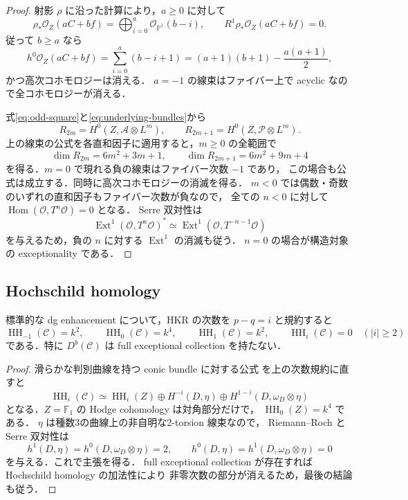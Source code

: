 \begin{proof}
射影 $\rho$ に沿った計算により，$a\ge0$ に対して
\[
 \rho_*\mathcal O_Z(aC+bf)
       =\bigoplus_{i=0}^a\mathcal O_{\mathbb P^1}(b-i),
 \qquad R^1\rho_*\mathcal O_Z(aC+bf)=0.
\]
従って $b\ge a$ なら
\[
 h^0\mathcal O_Z(aC+bf)
   =\sum_{i=0}^a(b-i+1)
   =(a+1)(b+1)-\frac{a(a+1)}2,
\]
かつ高次コホモロジーは消える．
$a=-1$ の線束はファイバー上で acyclic なので全コホモロジーが消える．

式\eqref{eq:odd-square}と\eqref{eq:underlying-bundles}から
\[
 R_{2m}=H^0(Z,\mathcal A\otimes L^m),\qquad
 R_{2m+1}=H^0(Z,\mathcal P\otimes L^m).
\]
上の線束の公式を各直和因子に適用すると，$m\ge0$ の全範囲で
\begin{equation}
 \dim R_{2m}=6m^2+3m+1,\qquad
 \dim R_{2m+1}=6m^2+9m+4
 \label{eq:Hilbert-parities}
\end{equation}
を得る．$m=0$ で現れる負の線束はファイバー次数 $-1$ であり，
この場合も公式は成立する．同時に高次コホモロジーの消滅を得る．
$m<0$ では偶数・奇数のいずれの直和因子もファイバー次数が負なので，
全ての $n<0$ に対して $\operatorname{Hom}(\mathcal O,T^n\mathcal O)=0$ となる．
Serre 双対性は
\[
 \operatorname{Ext}^1(\mathcal O,T^n\mathcal O)^*
 \simeq\operatorname{Ext}^1(\mathcal O,T^{-n-1}\mathcal O)
\]
を与えるため，負の $n$ に対する $\operatorname{Ext}^1$ の消滅も従う．
$n=0$ の場合が構造対象の exceptionality である．
\end{proof}

\subsection{Hochschild homology}

\begin{proposition}
\label{prop:HH-degree-three}
標準的な dg enhancement について，HKR の次数を $p-q=i$ と規約すると
\[
 \operatorname{HH}_{-1}(\mathcal C)=k^2,\qquad
 \operatorname{HH}_0(\mathcal C)=k^4,\qquad
 \operatorname{HH}_1(\mathcal C)=k^2,
 \qquad \operatorname{HH}_i(\mathcal C)=0\quad(|i|\ge2)
\]
である．特に $D^b(\mathcal C)$ は full exceptional collection を持たない．
\end{proposition}

\begin{proof}
滑らかな判別曲線を持つ conic bundle に対する公式
\cite[Theorem~8.12]{KuznetsovHH}を上の次数規約に直すと
\[
 \operatorname{HH}_i(\mathcal C)
 \simeq\operatorname{HH}_i(Z)
 \oplus H^{-i}(D,\eta)
 \oplus H^{1-i}(D,\omega_D\otimes\eta)
\]
となる．$Z=\mathbb F_1$ の Hodge cohomology は対角部分だけで，
$\operatorname{HH}_0(Z)=k^4$ である．
$\eta$ は種数3の曲線上の非自明な2-torsion 線束なので，
Riemann--Roch と Serre 双対性は
\[
 h^1(D,\eta)=h^0(D,\omega_D\otimes\eta)=2,
 \qquad h^0(D,\eta)=h^1(D,\omega_D\otimes\eta)=0
\]
を与える．これで主張を得る．
full exceptional collection が存在すれば Hochschild homology の加法性により
非零次数の部分が消えるため，最後の結論も従う．
\end{proof}
